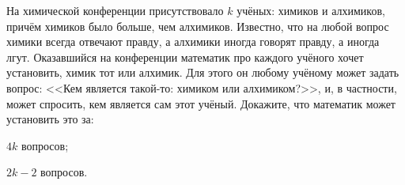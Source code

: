 На химической конференции присутствовало $k$ учёных: химиков и алхимиков, причём химиков было больше, чем
алхимиков. Известно, что на любой вопрос химики всегда отвечают правду, а алхимики иногда говорят правду,
а иногда лгут. Оказавшийся на конференции математик про каждого учёного хочет установить, химик тот или
алхимик. Для этого он любому учёному может задать вопрос: <<Кем является такой-то: химиком или
алхимиком?>>, и, в частности, может спросить, кем является сам этот учёный. Докажите, что математик может
установить это за:
\begin{enumcyr}
    \item $4k$ вопросов;
    \item $2k - 2$ вопросов.
\end{enumcyr}
